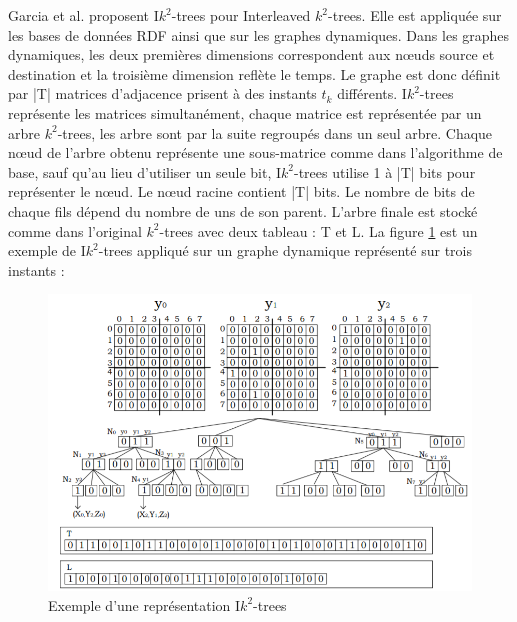 Garcia et al. \citep{garcia2014interleaved} proposent I$k^2$-trees pour Interleaved $k^2$-trees. Elle est appliquée sur les bases de données RDF ainsi que sur les graphes dynamiques. Dans les graphes dynamiques, les deux premières dimensions correspondent aux nœuds source et destination et la troisième dimension reflète le temps. Le graphe est donc définit par |T| matrices d'adjacence prisent à des instants $t_k$ différents. I$k^2$-trees représente les matrices simultanément, chaque matrice est représentée par un arbre $k^2$-trees, les arbre sont par la suite regroupés dans un seul arbre. Chaque nœud de l'arbre obtenu représente une sous-matrice comme dans l'algorithme de base, sauf qu'au lieu d'utiliser un seule bit, I$k^2$-trees utilise 1 à |T| bits pour représenter le nœud. Le nœud racine contient |T| bits. Le nombre de bits de chaque fils dépend du nombre de uns de son parent. L'arbre finale est stocké comme dans l'original $k^2$-trees avec deux tableau : T et L.
La figure \ref{Ik2-trees} est un exemple de I$k^2$-trees appliqué sur un graphe dynamique représenté sur trois instants \citep{garcia2014interleaved} :

\begin{figure}[H]
\begin{center}
\includegraphics[height=200 pt, width=380 pt]{./ressources/image/Ik2-trees.png} 
\end{center}
\caption{Exemple d'une représentation I$k^2$-trees}
\label{Ik2-trees}
\end{figure}

